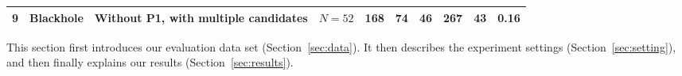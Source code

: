 \begin{table*}[htb]
\begin{tabular}{l|l|p{3cm}| r| r| r| r| r| r|r}
			
			
			9 & Blackhole & Without P1, with multiple candidates &$N=52$ &168& 74& 46 &267 & 43 & 0.16\\
			\bottomrule
		\end{tabular}
	
	\end{table*}

This section first introduces our evaluation data set (Section~\ref{sec:data}). It then describes the experiment settings (Section~\ref{sec:setting}), and then finally explains our results (Section~\ref{sec:results}).  

